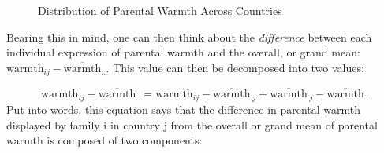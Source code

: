 \documentclass[
  letterpaper,
  DIV=11,
  numbers=noendperiod]{scrreprt}
\begin{document}
\begin{figure}


\caption{\label{fig-distributionwarmth}Distribution of Parental Warmth
Across Countries}

\end{figure}%

Bearing this in mind, one can then think about the \emph{difference}
between each individual expression of parental warmth and the overall,
or grand mean: \(\text{warmth}_{ij} - \overline{\text{warmth}}_{..}\).
This value can then be decomposed into two values:

\[\text{warmth}_{ij} - \overline{\text{warmth}}_{..} = \text{warmth}_{ij} - \overline{\text{warmth}}_{.j} + \overline{\text{warmth}}_{.j} - \overline{\text{warmth}}_{..}\]
Put into words, this equation says that the difference in parental
warmth displayed by family i in country j from the overall or grand mean
of parental warmth is composed of two components:
\end{document}
